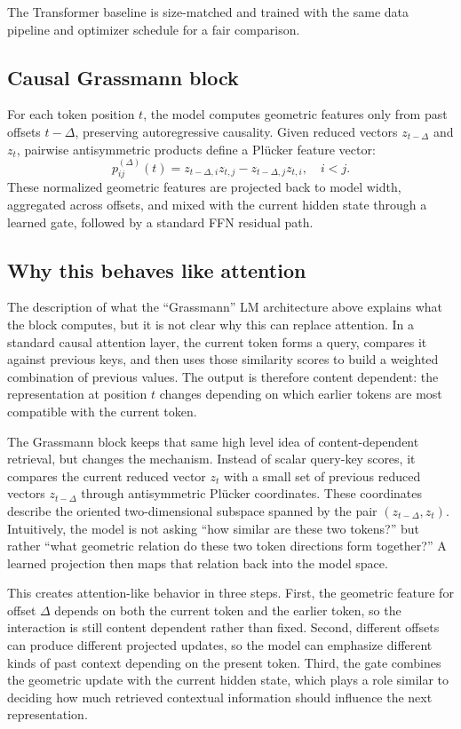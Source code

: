 \documentclass{article}
\begin{document}
The Transformer baseline is size-matched and trained with the same data pipeline and optimizer schedule for a fair comparison.

\subsection{Causal Grassmann block}
For each token position \(t\), the model computes geometric features only from past offsets \(t-\Delta\), preserving autoregressive causality. Given reduced vectors \(z_{t-\Delta}\) and \(z_t\), pairwise antisymmetric products define a Pl\"ucker feature vector:
\[
p_{ij}^{(\Delta)}(t) = z_{t-\Delta,i}z_{t,j} - z_{t-\Delta,j}z_{t,i}, \quad i<j.
\]
These normalized geometric features are projected back to model width, aggregated across offsets, and mixed with the current hidden state through a learned gate, followed by a standard FFN residual path.

\subsection{Why this behaves like attention}
The description of what the ``Grassmann'' LM architecture above explains what the block computes, but it is not clear why this can replace attention. In a standard causal attention layer, the current token forms a query, compares it against previous keys, and then uses those similarity scores to build a weighted combination of previous values. The output is therefore content dependent: the representation at position \(t\) changes depending on which earlier tokens are most compatible with the current token.

The Grassmann block keeps that same high level idea of content-dependent retrieval, but changes the mechanism. Instead of scalar query-key scores, it compares the current reduced vector \(z_t\) with a small set of previous reduced vectors \(z_{t-\Delta}\) through antisymmetric Pl\"ucker coordinates. These coordinates describe the oriented two-dimensional subspace spanned by the pair \((z_{t-\Delta}, z_t)\). Intuitively, the model is not asking ``how similar are these two tokens?'' but rather ``what geometric relation do these two token directions form together?'' A learned projection then maps that relation back into the model space.

This creates attention-like behavior in three steps. First, the geometric feature for offset \(\Delta\) depends on both the current token and the earlier token, so the interaction is still content dependent rather than fixed. Second, different offsets can produce different projected updates, so the model can emphasize different kinds of past context depending on the present token. Third, the gate combines the geometric update with the current hidden state, which plays a role similar to deciding how much retrieved contextual information should influence the next representation.
\end{document}
